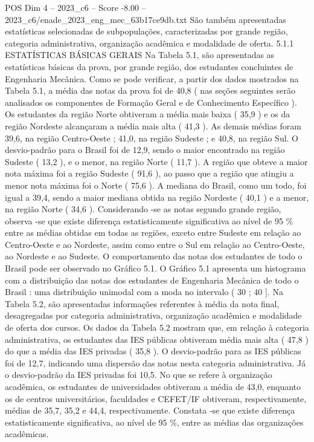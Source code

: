 \begin{textsample}{POS Dim 4 – 2023\_c6 – Score -8.00 – 2023\_c6/enade\_2023\_eng\_mec\_63b17ce9db.txt}
São também apresentadas estatísticas selecionadas de subpopulações, caracterizadas por grande região, categoria administrativa, organização acadêmica e modalidade de oferta. 5.1.1 ESTATÍSTICAS BÁSICAS GERAIS Na Tabela 5.1, são apresentadas as estatísticas básicas da prova, por grande região, dos estudantes concluintes de Engenharia Mecânica.
Como se pode verificar, a partir dos dados mostrados na Tabela 5.1, a média das notas da prova foi de 40,8 ( nas seções seguintes serão analisados os componentes de Formação Geral e de Conhecimento Específico ).
Os estudantes da região Norte obtiveram a média mais baixa ( 35,9 ) e os da região Nordeste alcançaram a média mais alta ( 41,3 ).
As demais médias foram 39,6, na região Centro-Oeste ; 41,0, na região Sudeste ; e 40,8, na região Sul.
O desvio-padrão para o Brasil foi de 12,9, sendo o maior encontrado na região Sudeste ( 13,2 ), e o menor, na região Norte ( 11,7 ).
A região que obteve a maior nota máxima foi a região Sudeste ( 91,6 ), ao passo que a região que atingiu a menor nota máxima foi o Norte ( 75,6 ).
A mediana do Brasil, como um todo, foi igual a 39,4, sendo a maior mediana obtida na região Nordeste ( 40,1 ) e a menor, na região Norte ( 34,6 ).
Considerando -se as notas segundo grande região, observa -se que existe diferença estatisticamente significativa ao nível de 95 \% entre as médias obtidas em todas as regiões, exceto entre Sudeste em relação ao Centro-Oeste e ao Nordeste, assim como entre o Sul em relação ao Centro-Oeste, ao Nordeste e ao Sudeste.
O comportamento das notas dos estudantes de todo o Brasil pode ser observado no Gráfico 5.1.
O Gráfico 5.1 apresenta um histograma com a distribuição das notas dos estudantes de Engenharia Mecânica de todo o Brasil : uma distribuição unimodal com a moda no intervalo ( 30 ; 40 ].
Na Tabela 5.2, são apresentadas informações referentes à média da nota final, desagregadas por categoria administrativa, organização acadêmica e modalidade de oferta dos cursos.
Os dados da Tabela 5.2 mostram que, em relação à categoria administrativa, os estudantes das IES públicas obtiveram média mais alta ( 47,8 ) do que a média das IES privadas ( 35,8 ).
O desvio-padrão para as IES públicas foi de 12,7, indicando uma dispersão das notas nesta categoria administrativa.
Já o desvio-padrão da IES privadas foi 10,5.
No que se refere à organização acadêmica, os estudantes de universidades obtiveram a média de 43,0, enquanto os de centros universitários, faculdades e CEFET/IF obtiveram, respectivamente, médias de 35,7, 35,2 e 44,4, respectivamente.
Constata -se que existe diferença estatisticamente significativa, ao nível de 95 \%, entre as médias das organizações acadêmicas.

\end{textsample}
